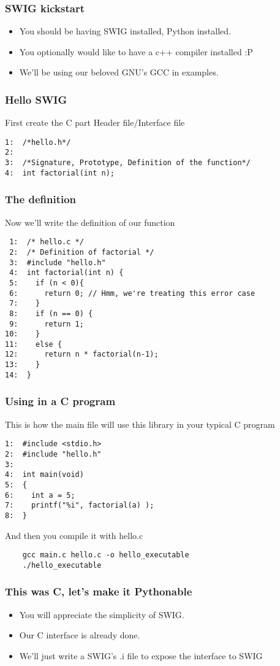 \documentclass{beamer}
\begin{document}
\begin{frame}
\frametitle{SWIG kickstart}
\label{sec-3_4}


\begin{itemize}
\item You should be having SWIG installed, Python installed.
\item You optionally would like to have a c++ compiler installed :P
\item We'll be using our beloved GNU's GCC in examples.
\end{itemize}
\end{frame}
\begin{frame}[fragile]
\frametitle{Hello SWIG}
\label{sec-3_5}

   First create the C part
   Header file/Interface file

\begin{verbatim}
1:  /*hello.h*/
2:  
3:  /*Signature, Prototype, Definition of the function*/
4:  int factorial(int n);
\end{verbatim}
   
\end{frame}
\begin{frame}[fragile]
\frametitle{The definition}
\label{sec-3_6}

   Now we'll write the definition of our function
\begin{verbatim}
 1:  /* hello.c */
 2:  /* Definition of factorial */
 3:  #include "hello.h"
 4:  int factorial(int n) {
 5:    if (n < 0){ 
 6:      return 0; // Hmm, we're treating this error case
 7:    }
 8:    if (n == 0) {
 9:      return 1;
10:    }
11:    else {
12:      return n * factorial(n-1);
13:    }
14:  }
\end{verbatim}
\end{frame}
\begin{frame}[fragile]
\frametitle{Using in a C program}
\label{sec-3_7}

   This is how the main file will use this library in your  typical C program
\begin{verbatim}
1:  #include <stdio.h>
2:  #include "hello.h"
3:  
4:  int main(void)
5:  {
6:    int a = 5;
7:    printf("%i", factorial(a) );
8:  }
\end{verbatim}
   And then you compile it with hello.c
\begin{verbatim}
    gcc main.c hello.c -o hello_executable
    ./hello_executable
\end{verbatim}
\end{frame}
\begin{frame}
\frametitle{This was C, let's make it Pythonable}
\label{sec-3_8}


\begin{itemize}
\item You will appreciate the simplicity of SWIG.
\item Our C interface is already done.
\item We'll just write a SWIG's .i file to expose the interface to SWIG
\end{itemize}
\end{frame}
\end{document}
